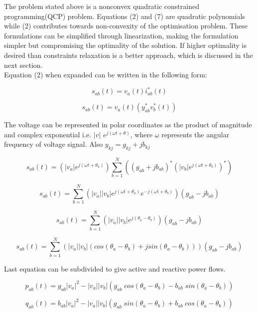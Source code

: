 The problem stated above is a nonconvex quadratic constrained programming(QCP) problem. Equations (2) and (7) are quadratic polynomials while (2) contributes towards non-convexity of the optimisation problem. These formulations can be simplified through linearization, making the formulation simpler but compromising the optimality of the solution. If higher optimality is desired than constraints relaxation is a better approach, which is discussed in the next section. \\

Equation (2) when expanded can be written in the following form:

\[
        s_{ab}(t) = v_a(t)i_{ab}^\ast(t) 
\]

\[
        s_{ab}(t) = v_a(t) \left ( y_{ab}^\ast v_{b}^\ast(t) \right ) 
\]


The voltage can be represented in polar coordinates as the product of magnitude and complex exponential i.e. $|v|$ $e^{j(\omega t+\theta)}$, where $\omega$ represents the angular frequency of voltage signal. Also $y_{kj} = g_{kj}+jb_{kj}$

\[
        s_{ab}(t) = \left (|v_a|e^{j(\omega t+\theta_a)}\right ) \sum_{b=1}^N \left ( \left ( g_{ab} + jb_{ab} \right ) ^\ast \left (|v_b|e^{j(\omega t+\theta_b)}\right ) ^\ast \right ) 
\]

\[
        s_{ab}(t) = \sum_{b=1}^N \left (|v_a| |v_b| e^{j(\omega t+\theta_a)} e^{-j(\omega t+\theta_b)} \right ) \left(  g_{ab}- jb_{ab} \right )
\]

\[
        s_{ab}(t) = \sum_{b=1}^N \left (|v_a| |v_b| e^{j(\theta_a-\theta_b)} \right )  \left(  g_{ab}- jb_{ab} \right )
\]

\[
        s_{ab}(t) = \sum_{b=1}^N \left (|v_a| |v_b| \left ( cos(\theta_a-\theta_b) + jsin(\theta_a-\theta_b)\right ) \right ) \left(  g_{ab}- jb_{ab} \right )
\]

Last equation can be subdivided to give active and reactive power flows. 

    \begin{equation}
        p_{ab}(t) = g_{ab}|v_a|^2 - |v_a| |v_b|\left (g_{ab} \; cos(\theta_a-\theta_b) - b_{ab} \; sin(\theta_a-\theta_b)\right )
    \end{equation}
    
    \begin{equation}
        q_{ab}(t) = b_{ab}|v_a|^2 - |v_a| |v_b|\left (g_{ab} \; sin(\theta_a-\theta_b) + b_{ab} \; cos(\theta_a-\theta_b)\right )
    \end{equation}
 
